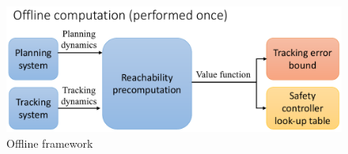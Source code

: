 \begin{figure}[]
  \centering
	\includegraphics[width=0.8\columnwidth]{fig/framework_offline}
	\caption{Offline framework}
	\label{fig:fw_offline}
	\vspace{-.1in}
\end{figure}

%
%
%
%
%
